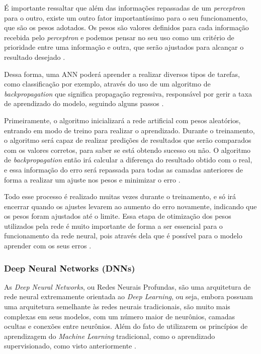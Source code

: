 É importante ressaltar que além das informações repassadas de um \emph{perceptron} para o outro, existe um outro fator importantíssimo para o seu funcionamento, que são os pesos adotados. Os pesos são valores definidos para cada informação recebida pelo \emph{perceptron} e podemos pensar no seu uso como um critério de prioridade entre uma informação e outra, que serão ajustados para alcançar o resultado desejado \cite{deepLearningTensorFlow}.

Dessa forma, uma ANN poderá aprender a realizar diversos tipos de tarefas, como classificação por exemplo, através do uso de um algoritmo de \emph{backpropagation} que significa propagação regressiva, responsável por gerir a taxa de aprendizado do modelo, seguindo alguns passos \cite{deepLearningTensorFlow}.

Primeiramente, o algoritmo inicializará a rede artificial com pesos aleatórios, entrando em modo de treino para realizar o aprendizado. Durante o treinamento, o algoritmo será capaz de realizar predições de resultados que serão comparados com os valores corretos, para saber se está obtendo sucesso ou não. O algoritmo de \emph{backpropagation} então irá calcular a diferença do resultado obtido com o real, e essa informação do erro será repassada para todas as camadas anteriores de forma a realizar um ajuste nos pesos e minimizar o erro \cite{deepLearningTensorFlow}.

Todo esse processo é realizado muitas vezes durante o treinamento, e só irá encerrar quando os ajustes levarem ao aumento do erro novamente, indicando que os pesos foram ajustados até o limite. Essa etapa de otimização dos pesos utilizados pela rede é muito importante de forma a ser essencial para o funcionamento da rede neural, pois através dela que é possível para o modelo aprender com os seus erros \cite{deepLearningTensorFlow}.

\subsubsection{Deep Neural Networks (DNNs)}
As \emph{Deep Neural Networks}, ou Redes Neurais Profundas, são uma arquitetura de rede neural extremamente orientada ao \emph{Deep Learning}, ou seja, embora possuam uma arquitetura semelhante às redes neurais tradicionais, são muito mais complexas em seus modelos, com um número maior de neurônios, camadas ocultas e conexões entre neurônios. Além do fato de utilizarem os princípios de aprendizagem do \emph{Machine Learning} tradicional, como o aprendizado supervisionado, como visto anteriormente \cite{deepLearningTensorFlow}.

